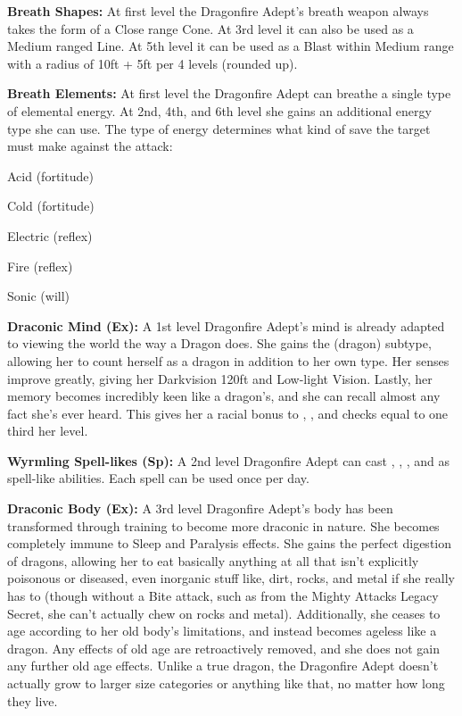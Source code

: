 \textbf{Breath Shapes:} At first level the Dragonfire Adept's breath weapon always takes the form of a Close range Cone. At 3rd level it can also be used as a Medium ranged Line. At 5th level it can be used as a Blast within Medium range with a radius of 10ft + 5ft per 4 levels (rounded up).

\textbf{Breath Elements:} At first level the Dragonfire Adept can breathe a single type of elemental energy. At 2nd, 4th, and 6th level she gains an additional energy type she can use. The type of energy determines what kind of save the target must make against the attack:

\begin{itemize*}
\item Acid (fortitude)
\item Cold (fortitude)
\item Electric (reflex)
\item Fire (reflex)
\item Sonic (will)
\end{itemize*}

\textbf{Draconic Mind (Ex):} A 1st level Dragonfire Adept's mind is already adapted to viewing the world the way a Dragon does. She gains the (dragon) subtype, allowing her to count herself as a dragon in addition to her own type. Her senses improve greatly, giving her Darkvision 120ft and Low-light Vision. Lastly, her memory becomes incredibly keen like a dragon's, and she can recall almost any fact she's ever heard. This gives her a racial bonus to , , and  checks equal to one third her level.

\textbf{Wyrmling Spell-likes (Sp):} A 2nd level Dragonfire Adept can cast , , , and  as spell-like abilities. Each spell can be used once per day.

\textbf{Draconic Body (Ex):} A 3rd level Dragonfire Adept's body has been transformed through training to become more draconic in nature. She becomes completely immune to Sleep and Paralysis effects. She gains the perfect digestion of dragons, allowing her to eat basically anything at all that isn't explicitly poisonous or diseased, even inorganic stuff like, dirt, rocks, and metal if she really has to (though without a Bite attack, such as from the Mighty Attacks Legacy Secret, she can't actually chew on rocks and metal). Additionally, she ceases to age according to her old body's limitations, and instead becomes ageless like a dragon. Any effects of old age are retroactively removed, and she does not gain any further old age effects. Unlike a true dragon, the Dragonfire Adept doesn't actually grow to larger size categories or anything like that, no matter how long they live.


